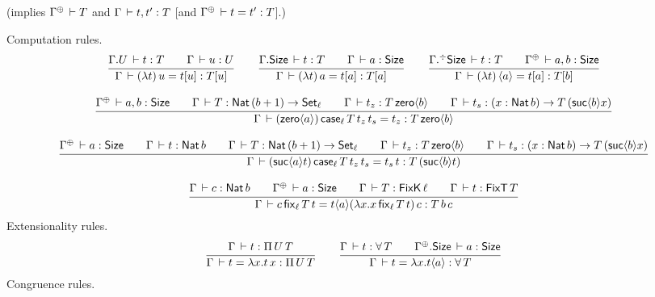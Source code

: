\documentclass[acmlarge,review,anonymous]{acmart}\settopmatter{printfolios=true}
\begin{document}
 (implies $\resurrect \Gamma \der T$ and $\Gamma \,\vdash t,t' : T$ [and $\resurrect\Gamma \der t = t' : T$].)

Computation rules.
\begin{gather*}
  \ru{\cext \Gamma U \der t : T \qquad
      \Gamma \der u : U
    }{\Gamma \der (\lambda t)\,u = t[u] : T[u]}
\qquad
  \ru{\cext \Gamma \Size \der t : T \qquad
      \Gamma \der a : \Size
    }{\Gamma \der (\lambda t)\,a = t[a] : T[a]}
\qquad
  \ru{\erext \Gamma \Size \der t : T \qquad
      \resurrect \Gamma \der a, b : \Size
    }{\Gamma \der (\lambda t)\,\ann a = t[a] : T[b]}
\\[2ex]
  \ru{\resurrect\Gamma \der a, b : \Size \qquad
      \Gamma \der T : \Nat (b + 1) \to \Set[\ell] \qquad
      \Gamma \der t_z : T\,\zero{b} \qquad
      \Gamma \der t_s : (x : \Nat b) \to T\,(\suc{b}x)
    }{\Gamma \der (\zero{a})\,\case[\ell] T {t_z} {t_s} = t_z : T\,\zero{b}}
\\[2ex]
  \ru{\resurrect\Gamma \der a : \Size \qquad
      \Gamma \der t : \Nat b \qquad
      \Gamma \der T : \Nat (b + 1) \to \Set[\ell] \qquad
      \Gamma \der t_z : T\,\zero{b} \qquad
      \Gamma \der t_s : (x : \Nat b) \to T\,(\suc{b}x)
    }{\Gamma \der (\suc{a} t)\,\case[\ell] T {t_z} {t_s} = t_s\,t : T\,(\suc{b} t)}
\\[2ex]
  \ru{\Gamma \der c : \Nat b \qquad
      \resurrect\Gamma \der a : \Size \qquad
      \Gamma \der T : \FixK\,\ell \qquad %
      \Gamma \der t : \FixT\,T %
     }{\Gamma \der c\,\fix[\ell] T t = t\ann a (\lambda x. x\,\fix[\ell] T t)\, c : T \,b \, c
     }%
\end{gather*}
Extensionality rules.
\begin{gather*}
  \ru{\Gamma \der t : \piT U T
    }{\Gamma \der t = \lambda x. t\,x : \piT U T}
\qquad
  \ru{\Gamma \der t : \forallT T \qquad
      \cext {\resurrect\Gamma} \Size \der a : \Size
    }{\Gamma \der t = \lambda x. t \ann a : \forallT T}
\end{gather*}
Congruence rules.
\end{document}
